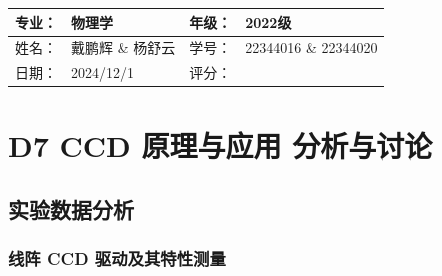 \documentclass[dvipsnames, svgnames,a4paper,11pt]{article}
\begin{document}



	

\clearpage
\begin{table}
	\renewcommand\arraystretch{1.7}
	\begin{tabularx}{\textwidth}{|X|X|X|X|}
	\hline
	专业：& 物理学 &年级：& 2022级\\
	\hline
	姓名： & 戴鹏辉 \& 杨舒云 & 学号：& 22344016 \& 22344020\\
	\hline
    日期：& 2024/12/1 & 评分： &\\
	\hline
	\end{tabularx}
\end{table}

\section{D7 \quad CCD 原理与应用 \quad\heiti 分析与讨论}

\subsection{实验数据分析}


	\subsubsection{线阵 CCD 驱动及其特性测量}
		
\end{document}
